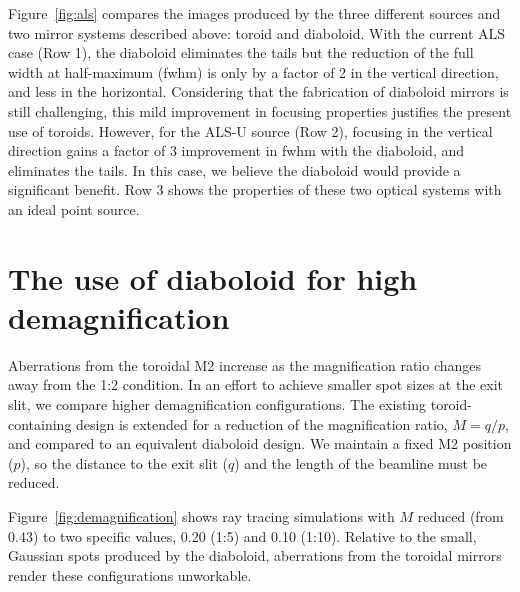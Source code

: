 \documentclass{iucr}       %
\newcommand{\inred}[1]{{\color{red}#1}}
\begin{document}
Figure~\ref{fig:als} compares the images produced by the three different sources and two mirror systems described above: toroid and diaboloid. With the current ALS case (Row 1), the diaboloid eliminates the tails but the reduction of the \inred{full width at half-maximum} (fwhm) is only by a factor of 2 in the vertical direction, and less in the horizontal. Considering that the fabrication of diaboloid mirrors is still challenging, this mild improvement in focusing properties justifies the present use of toroids. However, for the ALS-U source (Row 2), focusing in the vertical direction gains a factor of 3 improvement in fwhm with the diaboloid, and eliminates the tails. In this case, we believe the diaboloid would provide a significant benefit. Row 3 shows the properties of these two optical systems with an ideal point source.

\section{The use of diaboloid for high demagnification}
\label{sec:scan}

Aberrations from the toroidal M2 increase as the magnification ratio changes away from the 1:2 condition. In an effort to achieve smaller spot sizes at the exit slit, we compare higher demagnification configurations. The existing toroid-containing design is extended for a reduction of the magnification ratio, $M=q/p$, and compared to an equivalent diaboloid design. We maintain a fixed M2 position ($p$), so the distance to the exit slit ($q$) and the length of the beamline must be reduced.

Figure~\ref{fig:demagnification} shows ray tracing simulations with $M$ reduced (from 0.43) to two specific values, 0.20 (1:5) and 0.10 (1:10). Relative to the small, Gaussian spots produced by the diaboloid, aberrations from the toroidal mirrors render these configurations unworkable.
\end{document}
